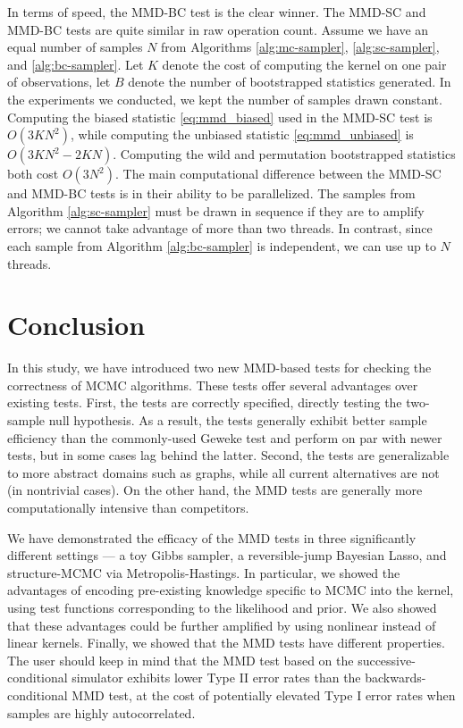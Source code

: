 \documentclass[a4paper,11pt]{article}
\begin{document}
In terms of speed, the MMD-BC test is the clear winner. The MMD-SC and MMD-BC tests are quite similar in raw operation count. Assume we have an equal number of samples $N$ from Algorithms \ref{alg:mc-sampler}, \ref{alg:sc-sampler}, and \ref{alg:bc-sampler}. Let $K$ denote the cost of computing the kernel on one pair of observations, let $B$ denote the number of bootstrapped statistics generated. In the experiments we conducted, we kept the number of samples drawn constant. Computing the biased statistic \eqref{eq:mmd_biased} used in the MMD-SC test is $O(3KN^{2})$, while computing the unbiased statistic \eqref{eq:mmd_unbiased} is $O(3KN^{2}-2KN)$. Computing the wild and permutation bootstrapped statistics both cost $O(3N^{2})$. The main computational difference between the MMD-SC and MMD-BC tests is in their ability to be parallelized. The samples from Algorithm \ref{alg:sc-sampler} must be drawn in sequence if they are to amplify errors; we cannot take advantage of more than two threads. In contrast, since each sample from Algorithm \ref{alg:bc-sampler} is independent, we can use up to $N$ threads.

\section{Conclusion}

In this study, we have introduced two new MMD-based tests for checking the correctness of MCMC algorithms. These tests offer several advantages over existing tests. First, the tests are correctly specified, directly testing the two-sample null hypothesis. As a result, the tests generally exhibit better sample efficiency than the commonly-used Geweke test and perform on par with newer tests, but in some cases lag behind the latter. Second, the tests are generalizable to more abstract domains such as graphs, while all current alternatives are not (in nontrivial cases). On the other hand, the MMD tests are generally more computationally intensive than competitors.

We have demonstrated the efficacy of the MMD tests in three significantly different settings --- a toy Gibbs sampler, a reversible-jump Bayesian Lasso, and structure-MCMC via Metropolis-Hastings. In particular, we showed the advantages of encoding pre-existing knowledge specific to MCMC into the kernel, using test functions corresponding to the likelihood and prior. We also showed that these advantages could be further amplified by using nonlinear instead of linear kernels. Finally, we showed that the MMD tests have different properties. The user should keep in mind that the MMD test based on the successive-conditional simulator exhibits lower Type II error rates than the backwards-conditional MMD test, at the cost of potentially elevated Type I error rates when samples are highly autocorrelated.
\end{document}
